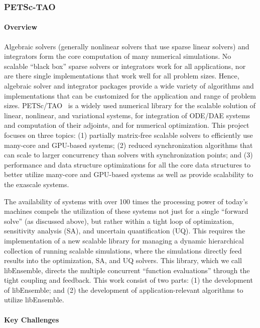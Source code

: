 \subsubsection{ PETSc-TAO} \label{subsubsect:petsc}
\paragraph{Overview} 

Algebraic solvers (generally nonlinear solvers that use sparse linear solvers) and integrators form the 
core computation of many numerical simulations. No scalable ``black box'' sparse solvers or integrators 
work for all applications, nor are there single implementations that work well for all problem sizes. 
Hence, algebraic solver and integrator packages provide a wide variety of algorithms and implementations 
that can be customized for the application and range of problem sizes. PETSc/TAO~\cite{petsc:homepage,petsc-man} 
is a widely used numerical library for the scalable solution of linear, nonlinear, and variational systems,
for integration of ODE/DAE systems and computation of their adjoints, and for numerical optimization. 
This project focuses on three topics: (1) partially matrix-free scalable solvers to efficiently use 
many-core and GPU-based systems; (2) reduced synchronization algorithms that can scale to larger 
concurrency than solvers with synchronization points; and (3) performance and data structure 
optimizations for all the core data structures to better utilize many-core and GPU-based 
systems as well as provide scalability to the exascale systems.

The availability of systems with over 100 times the processing power of today's machines compels the utilization 
of these systems not just for a single ``forward solve'' (as discussed above), but rather within a tight loop 
of optimization, sensitivity analysis (SA), and uncertain quantification (UQ). This requires the implementation 
of a new scalable library for managing a dynamic hierarchical collection of running scalable simulations, where 
the simulations directly feed results into the optimization, SA, and UQ solvers.  This library, which we call 
libEnsemble, directs the multiple concurrent ``function evaluations'' through the tight coupling and 
feedback. This work consist of two parts: (1) the development of libEnsemble; and (2) the development 
of application-relevant algorithms to utilize libEnsemble.

\paragraph{Key Challenges}

